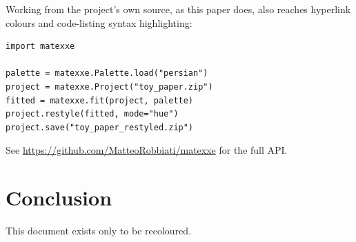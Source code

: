 \documentclass[11pt]{article}
\begin{document}
Working from the project's own source, as this paper does, also reaches
hyperlink colours and code-listing syntax highlighting:

\begin{lstlisting}
import matexxe

palette = matexxe.Palette.load("persian")
project = matexxe.Project("toy_paper.zip")
fitted = matexxe.fit(project, palette)
project.restyle(fitted, mode="hue")
project.save("toy_paper_restyled.zip")
\end{lstlisting}

See \url{https://github.com/MatteoRobbiati/matexxe} for the full API.

\section{Conclusion}
This document exists only to be recoloured.
\end{document}
